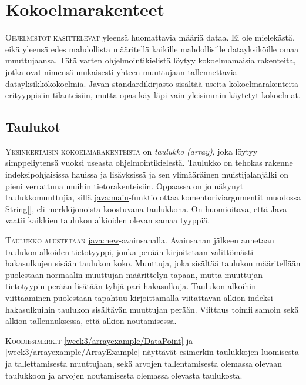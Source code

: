 \documentclass[openany]{book}
\newcommand{\newthought}[1]{\smallskip\textsc{#1}}
\newcommand{\eng}[1]{\textit{(#1)}}
\newcommand{\new}[1]{\textit{\gls{#1}}}
\newcommand{\neweng}[2]{\new{#1} \eng{#2}}
\newcommand{\java}[1]{\underline{\gls{java:#1}}}
\begin{document}

\section{Kokoelmarakenteet}
\label{kokoelmista}

\newthought{Ohjelmistot käsittelevät} yleensä huomattavia määriä dataa. Ei ole mielekästä, eikä
yleensä edes mahdollista määritellä kaikille mahdollisille datayksiköille omaa muuttujaansa.
Tätä varten ohjelmointikielistä löytyy kokoelmamaisia rakenteita, jotka ovat nimensä mukaisesti
yhteen muuttujaan tallennettavia datayksikkökokoelmia. Javan standardikirjasto sisältää useita
kokoelmarakenteita erityyppisiin tilanteisiin, mutta opas käy läpi vain yleisimmin käytetyt
kokoelmat.

\subsection{Taulukot}
\label{taulukot}

\newthought{Yksinkertaisin kokoelmarakenteista} on \neweng{taulukko}{array}, joka löytyy
simppeliytensä vuoksi useasta ohjelmointikielestä. Taulukko on tehokas rakenne indeksipohjaisissa
hauissa ja lisäyksissä ja sen ylimääräinen muistijalanjälki on pieni verrattuna muihin
tietorakenteisiin. Oppaassa on jo näkynyt taulukkomuuttujia, sillä \java{main}-funktio ottaa
komentoriviargumentit muodossa String[], eli merkkijonoista koostuvana taulukkona. On huomioitava,
että Java vaatii kaikkien taulukon alkioiden olevan samaa tyyppiä.

\newthought{Taulukko alustetaan} \java{new}-avainsanalla. Avainsanan jälkeen annetaan taulukon
alkoiden tietotyyppi, jonka perään kirjoitetaan välittömästi hakasulkujen sisään taulukon koko.
Muuttuja, joka sisältää taulukon määritellään puolestaan normaalin muuttujan määrittelyn tapaan,
mutta muuttujan tietotyypin perään lisätään tyhjä pari hakasulkuja. Taulukon alkoihin viittaaminen
puolestaan tapahtuu kirjoittamalla viitattavan alkion indeksi hakasulkuihin taulukon sisältävän
muuttujan perään. Viittaus toimii samoin sekä alkion tallennuksessa, että alkion noutamisessa.

\newthought{Koodiesimerkit} \ref{week3/arrayexample/DataPoint} ja
\ref{week3/arrayexample/ArrayExample} näyttävät esimerkin taulukkojen luomisesta ja
tallettamisesta muuttujaan, sekä arvojen tallentamisesta olemassa olevaan taulukkoon ja arvojen
noutamisesta olemassa olevasta taulukosta.
\end{document}
